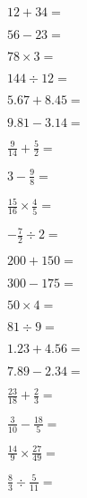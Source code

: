 \documentclass[10pt]{exam}
\begin{document}
\begin{questions}
\begin{multicols}{2}
\question \( 12 + 34 =\)
\vspace*{0.5in}

\question \( 56 - 23 =\)
\vspace*{0.5in}

\question \( 78 \times 3 =\)
\vspace*{0.5in}

\question \( 144 \div 12 =\)
\vspace*{0.5in}

\question \( 5.67 + 8.45 =\)
\vspace*{0.5in}

\question \( 9.81 - 3.14 =\)
\vspace*{0.5in}

\question \( \displaystyle \frac{9}{14} + \frac{5}{2} =\)
\vspace*{0.5in}

\question \( \displaystyle 3 - \frac{9}{8} =\)
\vspace*{0.5in}

\question \( \displaystyle \frac{15}{16} \times \frac{4}{5} =\)
\vspace*{0.5in}

\question \( \displaystyle -\frac{7}{2} \div 2 =\)
\vspace*{0.5in}

\question \( 200 + 150 =\)
\vspace*{0.5in}

\question \( 300 - 175 =\)
\vspace*{0.5in}

\question \( 50 \times 4 =\)
\vspace*{0.5in}

\question \( 81 \div 9 =\)
\vspace*{0.5in}

\question \( 1.23 + 4.56 =\)
\vspace*{0.5in}

\question \( 7.89 - 2.34 =\)
\vspace*{0.5in}

\question \( \displaystyle \frac{23}{18} + \frac{2}{3} =\)
\vspace*{0.5in}

\question \( \displaystyle \frac{3}{10} - \frac{18}{5} =\)
\vspace*{0.5in}

\question \( \displaystyle \frac{14}{9} \times \frac{27}{49} =\)
\vspace*{0.5in}

\question \( \displaystyle \frac{8}{3} \div \frac{5}{11} =\)
\vspace*{0.5in}

\end{multicols}
\end{questions}
\end{document}
